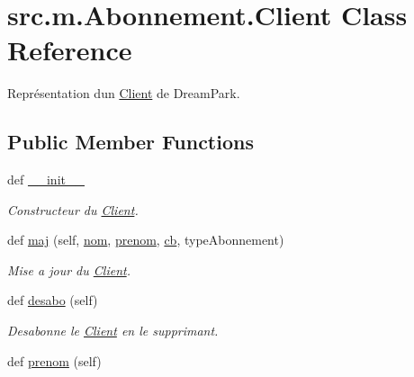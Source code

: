 \hypertarget{classsrc_1_1m_1_1_abonnement_1_1_client}{}\section{src.\+m.\+Abonnement.\+Client Class Reference}
\label{classsrc_1_1m_1_1_abonnement_1_1_client}


Représentation d\textquotesingle{}un \hyperlink{classsrc_1_1m_1_1_abonnement_1_1_client}{Client} de Dream\+Park.  


\subsection*{Public Member Functions}
\begin{DoxyCompactItemize}
\item 
def \hyperlink{classsrc_1_1m_1_1_abonnement_1_1_client_a53746d797b85e8dc5a990292b7ba9871}{\+\_\+\+\_\+init\+\_\+\+\_\+}
\begin{DoxyCompactList}\small\item\em Constructeur du \hyperlink{classsrc_1_1m_1_1_abonnement_1_1_client}{Client}. \end{DoxyCompactList}\item 
def \hyperlink{classsrc_1_1m_1_1_abonnement_1_1_client_a9b28aa2a2c3fabeb8bb3b8262eb7b393}{maj} (self, \hyperlink{classsrc_1_1m_1_1_abonnement_1_1_client_a0dfdf707e2b63e0f205e62a4ec8af994}{nom}, \hyperlink{classsrc_1_1m_1_1_abonnement_1_1_client_a56e3db34c5e2fbca9041a2c9ad66b60c}{prenom}, \hyperlink{classsrc_1_1m_1_1_abonnement_1_1_client_acfb9beb5fb0150b175908fb3f5a7f258}{cb}, type\+Abonnement)
\begin{DoxyCompactList}\small\item\em Mise a jour du \hyperlink{classsrc_1_1m_1_1_abonnement_1_1_client}{Client}. \end{DoxyCompactList}\item 
\hypertarget{classsrc_1_1m_1_1_abonnement_1_1_client_ad73d900cc6db4c3a054859b5adfc609c}{}def \hyperlink{classsrc_1_1m_1_1_abonnement_1_1_client_ad73d900cc6db4c3a054859b5adfc609c}{desabo} (self)\label{classsrc_1_1m_1_1_abonnement_1_1_client_ad73d900cc6db4c3a054859b5adfc609c}

\begin{DoxyCompactList}\small\item\em Desabonne le \hyperlink{classsrc_1_1m_1_1_abonnement_1_1_client}{Client} en le supprimant. \end{DoxyCompactList}\item 
\hypertarget{classsrc_1_1m_1_1_abonnement_1_1_client_a56e3db34c5e2fbca9041a2c9ad66b60c}{}def \hyperlink{classsrc_1_1m_1_1_abonnement_1_1_client_a56e3db34c5e2fbca9041a2c9ad66b60c}{prenom} (self)\label{classsrc_1_1m_1_1_abonnement_1_1_client_a56e3db34c5e2fbca9041a2c9ad66b60c}


\end{DoxyCompactItemize}
